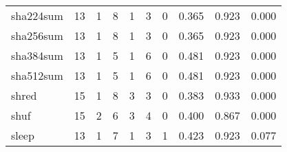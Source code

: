 \begin{longtable}{lp{2.0cm}p{2.0cm}p{2.0cm}p{2.0cm}p{2.0cm}p{2.0cm}p{2.0cm}p{2.0cm}p{2.0cm}}
sha224sum &                     13 &                                             1 &                                            8 &                                           1 &                                            3 &                                          0 &                                0.365 &                                  0.923 &                                0.000 \\
sha256sum &                     13 &                                             1 &                                            8 &                                           1 &                                            3 &                                          0 &                                0.365 &                                  0.923 &                                0.000 \\
sha384sum &                     13 &                                             1 &                                            5 &                                           1 &                                            6 &                                          0 &                                0.481 &                                  0.923 &                                0.000 \\
sha512sum &                     13 &                                             1 &                                            5 &                                           1 &                                            6 &                                          0 &                                0.481 &                                  0.923 &                                0.000 \\
shred     &                     15 &                                             1 &                                            8 &                                           3 &                                            3 &                                          0 &                                0.383 &                                  0.933 &                                0.000 \\
shuf      &                     15 &                                             2 &                                            6 &                                           3 &                                            4 &                                          0 &                                0.400 &                                  0.867 &                                0.000 \\
sleep     &                     13 &                                             1 &                                            7 &                                           1 &                                            3 &                                          1 &                                0.423 &                                  0.923 &                                0.077 \\

\end{longtable}
